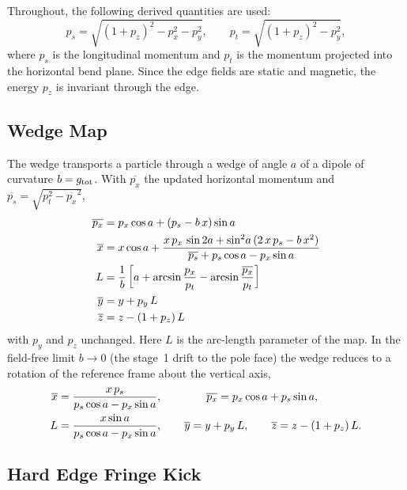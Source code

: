 {Throughout, the following derived quantities are used:
\begin{equation}
  p_s = \sqrt{(1 + p_z)^2 - p_x^2 - p_y^2}, \qquad
  p_t = \sqrt{(1 + p_z)^2 - p_y^2},
\end{equation}
where $p_s$ is the longitudinal momentum and $p_t$ is the momentum projected into the horizontal
bend plane. Since the edge fields are static and magnetic, the energy $p_z$ is invariant through the
edge.

\subsection{Wedge Map}

The wedge transports a particle through a wedge of angle $a$ of a dipole of curvature $b = g_{\text{tot}}$.
With $\overline{p_x}$ the updated horizontal momentum and $\overline{p_s} = \sqrt{p_t^2 - \overline{p_x}^2}$,
\begin{align}
  \overline{p_x} &= p_x \cos a + (p_s - b \, x) \sin a \nonumber \\
  \overline{x}   &= x \cos a
     + \frac{x \, p_x \, \sin 2a + \sin^2\!a \, (2 \, x \, p_s - b \, x^2)}{\overline{p_s} + p_s \cos a - p_x \sin a} \nonumber \\
  L    &= \frac{1}{b} \left[ a + \arcsin \frac{p_x}{p_t} - \arcsin \frac{\overline{p_x}}{p_t} \right] \\
  \overline{y}   &= y + p_y \, L \nonumber \\
  \overline{z}   &= z - (1 + p_z) \, L \nonumber
\end{align}
with $p_y$ and $p_z$ unchanged. Here $L$ is the arc-length parameter of the map. In the field-free
limit $b \to 0$ (the stage~1 drift to the pole face) the wedge reduces to a rotation of the reference
frame about the vertical axis,
\begin{align}
  \overline{x}   &= \frac{x \, p_s}{p_s \cos a - p_x \sin a}, \qquad\qquad
  \overline{p_x}  = p_x \cos a + p_s \sin a, \nonumber \\
  L    &= \frac{x \sin a}{p_s \cos a - p_x \sin a}, \qquad
  \overline{y}    = y + p_y \, L, \qquad
  \overline{z}    = z - (1 + p_z) \, L.
\end{align}

\subsection{Hard Edge Fringe Kick}

}
